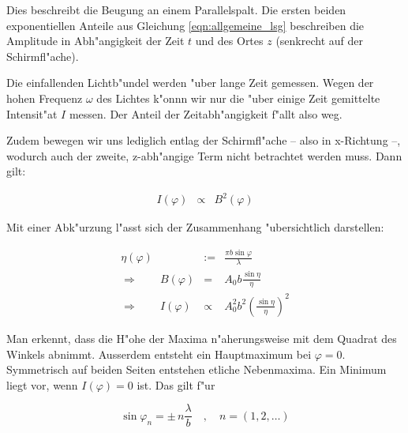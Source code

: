 		Dies beschreibt die Beugung an einem Parallelspalt.
		Die ersten beiden exponentiellen Anteile aus Gleichung \ref{eqn:allgemeine_lsg} beschreiben die Amplitude in Abh"angigkeit der Zeit $t$ und des Ortes $z$ (senkrecht auf der Schirmfl"ache).

		Die einfallenden Lichtb"undel werden "uber lange Zeit gemessen.
		Wegen der hohen Frequenz $\omega$ des Lichtes k"onnn wir nur die "uber einige Zeit gemittelte Intensit"at $I$ messen. Der Anteil der Zeitabh"angigkeit f"allt also weg.

		Zudem bewegen wir uns lediglich entlag der Schirmfl"ache -- also in x-Richtung --, wodurch auch der zweite, z-abh"angige Term nicht betrachtet werden muss.
		Dann gilt:

		\begin{eqnarray}
			I(\varphi) & \propto & B^2(\varphi) \nonumber
		\end{eqnarray}

		Mit einer Abk"urzung l"asst sich der Zusammenhang "ubersichtlich darstellen:

		\begin{eqnarray}
			\eta(\varphi) & := & \frac{\pi b \sin{\varphi}}{\lambda} \nonumber \\
			\Rightarrow \qquad
			B(\varphi) & = & A_0 b \frac{\sin{\eta}}{\eta} \label{amplitude_einfach} \\
			\Rightarrow \qquad
			I(\varphi) & \propto & A_0^2 b^2 \left(\frac{\sin{\eta}}{\eta}\right)^2
			\label{prop_einzelspalt}
		\end{eqnarray}

		Man erkennt, dass die H"ohe der Maxima n"aherungsweise mit dem Quadrat des Winkels abnimmt.
		Ausserdem entsteht ein Hauptmaximum bei $\varphi = 0$. Symmetrisch auf beiden Seiten entstehen etliche Nebenmaxima.
		Ein Minimum liegt vor, wenn $I(\varphi) = 0$ ist. Das gilt f"ur

		\begin{equation}
			\sin{\varphi_n} = \pm \, n \frac{\lambda}{b} \quad , \quad n = \left(1, 2, \dots\right)
		\end{equation}

